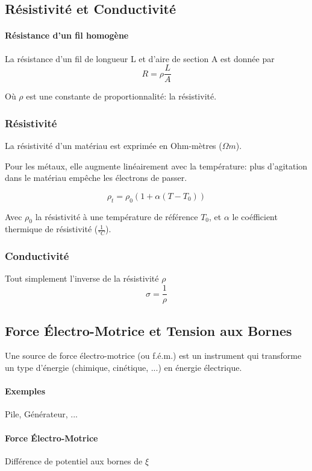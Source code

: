 \begin{multicols*}{2}
    \subsection{Résistivité et Conductivité}
    
    \paragraph{Résistance d'un fil homogène}
    La résistance d'un fil de longueur L et d'aire de section A est donnée par
    \[ R = \rho \frac{L}{A} \]
    
    Où $\rho$ est une constante de proportionnalité: la résistivité.
    
    \subsubsection{Résistivité}
    
    La résistivité d'un matériau est exprimée en Ohm-mètres ($\Omega m$).
    
    Pour les métaux, elle augmente linéairement avec la température: plus d'agitation dans le matériau empêche les électrons de passer.
    
    \[ \rho_t = \rho_0 (1 + \alpha (T-T_0)) \]
    
    Avec $\rho_0$ la résistivité à une température de référence $T_0$, et $\alpha$ le coéfficient thermique de résistivité ($\frac{1}{°C}$).
    
    \subsubsection{Conductivité}
    
    Tout simplement l'inverse de la résistivité $\rho$
    \[ \sigma = \frac{1}{\rho} \]
    
    \subsection{Force Électro-Motrice et Tension aux Bornes}
    
    Une source de force électro-motrice (ou f.é.m.) est un instrument qui transforme un type d'énergie (chimique, cinétique, ...) en énergie électrique.
    \paragraph{Exemples} Pile, Générateur, ...
    
    \paragraph{Force Électro-Motrice} Différence de potentiel aux bornes de $\xi$
    

\end{multicols*}
